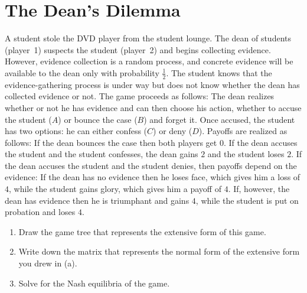 \documentclass[12pt,a4paper]{article}
\begin{document}
\section{The Dean's Dilemma}
A student stole the DVD player from the student lounge.
The dean of students (player~1) suspects the student (player~2) and begins collecting evidence.
However, evidence collection is a random process, and concrete evidence will be available to the dean only with probability $\tfrac{1}{2}$.
The student knows that the evidence-gathering process is under way but does not know whether the dean has collected evidence or not.
The game proceeds as follows:
The dean realizes whether or not he has evidence and can then choose his action, whether to accuse the student ($A$) or bounce the case ($B$) and forget it.
Once accused, the student has two options: he can either confess ($C$) or deny ($D$).
Payoffs are realized as follows:
If the dean bounces the case then both players get $0$.
If the dean accuses the student and the student confesses, the dean gains $2$ and the student loses $2$.
If the dean accuses the student and the student denies, then payoffs depend on the evidence:
If the dean has no evidence then he loses face, which gives him a loss of $4$, while the student gains glory, which gives him a payoff of $4$.
If, however, the dean has evidence then he is triumphant and gains $4$, while the student is put on probation and loses $4$.

\begin{enumerate}[label=\alph*.]
    \item Draw the game tree that represents the extensive form of this game.
    \item Write down the matrix that represents the normal form of the extensive form you drew in (a).
    \item Solve for the Nash equilibria of the game.
\end{enumerate}
\end{document}
